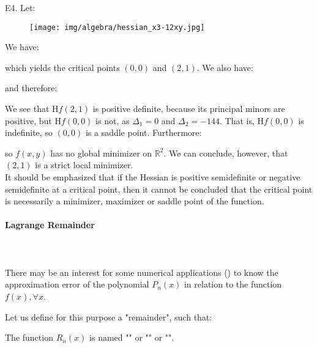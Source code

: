 	\begin{tcolorbox}[colframe=black,colback=white,sharp corners]
	E4. Let:
	
	\begin{figure}[H]
		\centering
		\texttt{[image: img/algebra/hessian\_x3-12xy.jpg]}
	\end{figure}
	We have:
	
	which yields the critical points $(0, 0)$ and $(2, 1)$. We also have:
	
	and therefore:
	
	We see that $\mathrm{H}f(2, 1)$ is positive definite, because its principal minors are positive, but $\mathrm{H}f(0, 0)$ is not, as $\Delta_1 = 0$ and $\Delta_2 = -144$. That is, $\mathrm{H}f(0, 0)$ is indefinite, so $(0, 0)$ is a saddle point.
	\newline
	Furthermore:
	
	so $f(x, y)$ has no global minimizer on $\mathds{R}^2$. We can conclude, however, that $(2, 1)$ is a strict local minimizer.\\
	
	It should be emphasized that if the Hessian is positive semidefinite or negative semidefinite at a critical point, then it cannot be concluded that the critical point is necessarily a minimizer, maximizer or saddle point of the function.
	\end{tcolorbox}
	
	
	\paragraph{Lagrange Remainder}\mbox{}\\\\
	There may be an interest for some numerical applications () to know the approximation error of the polynomial $P_n(x)$ in relation to the function $f(x), \forall x$.
	
	Let us define for this purpose a "remainder", such that:
	
	\begin{theorem}
	The function $R_n(x)$ is named "" or "" or "".
	
	\end{theorem}
	
